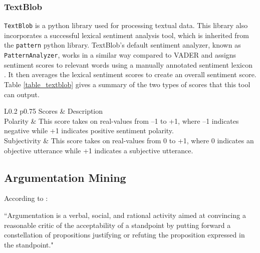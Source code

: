 \subsubsection{TextBlob}

\texttt{TextBlob} is a python library used for processing textual data. This library also incorporates a successful lexical sentiment analysis tool, which is inherited from the \texttt{pattern} python library. TextBlob's default sentiment analyzer, known as \texttt{PatternAnalyzer}, works in a similar way compared to VADER and assigns sentiment scores to relevant words using a manually annotated sentiment lexicon \citep{smedt2012pattern}. It then averages the lexical sentiment scores to create an overall sentiment score. Table \ref{table_textblob} gives a summary of the two types of scores that this tool can output.

\begin{table}[H]
	\centering
	\small
	\setlength{\tabcolsep}{0.5em}
	\def\arraystretch{1.1}
	\begin{threeparttable}
		\begin{tabular}{L{0.2\linewidth} p{0.75\linewidth}}
			\toprule[0.25mm]
			Scores & Description \\
			\midrule[0.35mm]
			Polarity & This score takes on real-values from --1 to +1, where --1 indicates negative while +1 indicates positive sentiment polarity. \\[20pt]
			Subjectivity  & This score takes on real-values from 0 to +1, where 0 indicates an objective utterance while +1 indicates a subjective utterance.\\[10pt]
			\bottomrule[0.25mm]
		\end{tabular}
		\caption{Tabular summary of TextBlob \texttt{PatternAnalyzer} sentiment scores}
		\label{table_textblob}
	\end{threeparttable}
\end{table}

\subsection{Argumentation Mining}

According to \citet{van2004systematic}:

\begin{displayquote}
``Argumentation is a verbal, social, and rational activity aimed at convincing a reasonable critic of the acceptability of a standpoint by putting forward a constellation of propositions justifying or refuting the proposition expressed in the standpoint."
\end{displayquote}

